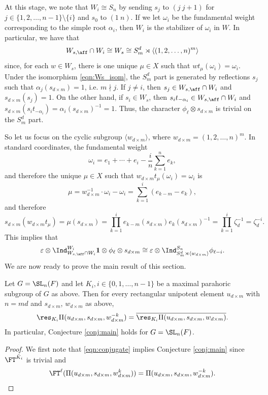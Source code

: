 At this stage, we note that $W_i\cong S_n$ by sending $s_j$ to $(j\ j+1)$ for $j\in\{1,2,\ldots,n-1\}\setminus\{i\}$ and $s_0$ to $(1\ n)$. If we let $\omega_i$ be the fundamental weight corresponding to the simple root $\alpha_i$, then $W_i$ is the stabilizer of $\omega_i$ in $W$. In particular, we have that
\begin{equation}\label{eqn:Ws_isom}
    W_{s,\aff}\cap W_i\cong W_s\cong S_m^d\rtimes\langle (1,2,\ldots,n)^m\rangle
\end{equation}
since, for each $w\in W_s$, there is one unique $\mu\in X$ such that $wt_\mu(\omega_i)=\omega_i$. Under the isomorphism \eqref{eqn:Ws_isom}, the $S_m^d$ part is generated by reflections $s_j$ such that $\alpha_j(s_{d\times m})=1$, i.e. $m\nmid j$. If $j\neq i$, then $s_j\in W_{s,\aff}\cap W_i$ and $s_{d\times m}(s_j)=1$. On the other hand, if $s_i\in W_s$, then $s_it_{-\alpha_i}\in W_{s,\aff}\cap W_i$ and $s_{d\times m}(s_it_{-\alpha_i})=\alpha_i(s_{d\times m})^{-1}=1$. Thus, the character $\phi_\ell\otimes s_{d\times m}$ is trivial on the $S_m^d$ part.

So let us focus on the cyclic subgroup $\langle w_{d\times m}\rangle$, where $w_{d\times m}=(1,2,\ldots, n)^m$. In standard coordinates, the fundamental weight
$$\omega_i=e_1+\cdots+e_i-\frac{i}{n}\sum_{k=1}^ne_k,$$
and therefore the unique $\mu\in X$ such that $w_{d\times m}t_\mu(\omega_i)=\omega_i$ is 
$$\mu=w_{d\times m}^{-1}\cdot\omega_i-\omega_i=\sum_{k=1}^i(e_{k-m}-e_k),$$
and therefore $$s_{d\times m}(w_{d\times m}t_\mu)=\mu(s_{d\times m})=\prod_{k=1}^i e_{k-m}(s_{d\times m})e_k(s_{d\times m})^{-1}=\prod_{k=1}^i\zeta_d^{-1}=\zeta_d^{-i}.$$
This implies that 
$$\varepsilon\otimes\Ind^{W_i}_{W_{s,\aff}\cap W_i}\mathbf{1}\otimes \phi_\ell\otimes s_{d\times m}\cong\varepsilon\otimes\Ind^{S_n}_{S_m^d\rtimes\langle w_{d\times m}\rangle}\phi_{\ell-i}.$$
We are now ready to prove the main result of this section.

\begin{theorem}
    Let $G=\SL_n(F)$ and let $K_i, i\in\{0,1,\ldots,n-1\}$ be a maximal parahoric subgroup of $G$ as above. Then for every rectangular unipotent element $u_{d\times m}$ with $n=md$ and $s_{d\times m}$, $w_{d\times m}$ as above,
    \begin{equation}\label{eqn:conjugate}
        \res_{K_i}\Pi(u_{d\times m}, s_{d\times m},w_{d\times m}^{-k})=\overline{\res_{K_i}\Pi(u_{d\times m}, s_{d\times m},w_{d\times m})}.
    \end{equation}
    In particular, Conjecture \ref{conj:main} holds for $G=\SL_n(F)$.
\end{theorem}

\begin{proof}
    We first note that \eqref{eqn:conjugate} implies Conjecture \ref{conj:main} since $\FT^{\bar{K}_i}$ is trivial and $$\FT^\ell(\Pi(u_{d\times m}, s_{d\times m},w_{d\times m}^{k}))=\Pi(u_{d\times m}, s_{d\times m},w_{d\times m}^{-k}).$$

\end{proof}